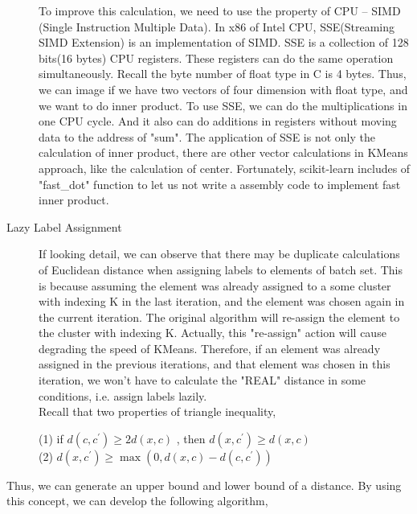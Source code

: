 \documentclass[final,leqno,onefignum,onetabnum]{siamltexmm}
\begin{document}
\begin{description}
To improve this calculation, we need to use the property of CPU -- SIMD (Single Instruction Multiple Data). In x86 of Intel CPU, SSE(Streaming SIMD Extension) is an implementation of SIMD. SSE is a collection of 128 bits(16 bytes) CPU registers. These registers can do the same operation simultaneously. Recall the byte number of float type in C is 4 bytes. Thus, we can image if we have two vectors of four dimension with float type, and we want to do inner product. To use SSE, we can do the multiplications in one CPU cycle. And it also can do additions in registers without moving data to the address of "sum". The application of SSE is not only the calculation of inner product, there are other vector calculations in KMeans approach, like the calculation of center. Fortunately, scikit-learn includes of "fast\_dot" function to let us not write a assembly code to implement fast inner product.

\item[Lazy Label Assignment]

If looking detail, we can observe that there may be duplicate calculations of Euclidean distance when assigning labels to elements of batch set. This is because assuming the element was already assigned to a some cluster with indexing K in the last iteration, and the element was chosen again in the current iteration. The original algorithm will re-assign the element to the cluster with indexing K. Actually, this "re-assign" action will cause degrading the speed of KMeans. Therefore, if an element was already assigned in the previous iterations, and that element was chosen in this iteration, we won't have to calculate the "REAL" distance in some conditions, i.e. assign labels lazily. \\

Recall that two properties of triangle inequality, \\
\begin{center}
	\begin{figure}[H]
	\end{figure}
\end{center}
(1) if $d(c,c^{'}) \geq 2d(x,c)$ , then $d(x,c^{'}) \geq d(x,c)$ \\
(2) $d(x,c^{'}) \geq \max(0,d(x,c)-d(c,c^{'}))$ \\
\end{description}
Thus, we can generate an upper bound and lower bound of a distance. By using this concept, we can develop the following algorithm, \\
\end{document}
